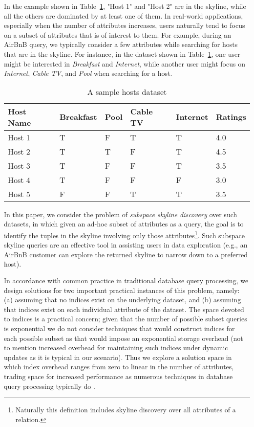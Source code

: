 In the example shown in Table~\ref{tab:hostDataset}, "Host 1" and "Host 2" are in the skyline, while all the others are dominated by at least one of them.
In real-world applications, especially when the number of attributes increases, users naturally tend to focus on a subset of attributes that is of interest to them. For example, during an AirBnB query, 
we typically consider a few attributes while searching for hosts that are in the skyline. For instance, in the dataset shown in Table~\ref{tab:hostDataset}, one user might be interested in \textit{Breakfast} and \textit{Internet}, while another user might focus on \textit{Internet}, \textit{Cable TV}, and \textit{Pool} when searching for a host.


\begin{table}[!t]
\centering
\caption{A sample hosts dataset}\label{tab:hostDataset}
\begin{tabular}{|p{1cm}|p{1.3cm}|p{0.70cm}|p{0.7cm}|p{1cm}|p{1cm}|}
    \hline 
    Host Name & Breakfast & Pool & Cable TV & Internet & Ratings\\
    \hline 
    Host 1 & T & F & T & T & 4.0\\
    Host 2 & T & T & F & T & 4.5\\
    Host 3 & T & F & F & T & 3.5\\
    Host 4 & T & F & F & F & 3.0\\
    Host 5 & F & F & T & T & 3.5\\
    \hline
\end{tabular}
\end{table}

In this paper, we consider the problem of {\em subspace skyline discovery} over such datasets, in which given an ad-hoc subset of attributes as a query, the goal is to identify 
the tuples in the skyline involving only those attributes\footnote{Naturally this definition includes skyline discovery over all attributes of a relation.}. Such subspace skyline queries are an effective tool in assisting users in data exploration (e.g., an AirBnB customer can explore the returned skyline to narrow down to a preferred host). 

In accordance with common practice in traditional database query processing, we design solutions for two important practical instances of this problem, namely: (a) assuming that no indices exist on the underlying dataset, and (b) assuming that indices exist on each individual attribute of the dataset. The space devoted to indices is a practical concern; given that the number of possible subset queries is exponential we do not consider techniques that would construct indices for each possible subset as that would impose an exponential storage overhead (not to mention increased overhead for maintaining such indices under dynamic updates as it is typical in our scenario). Thus we explore a solution space in which index overhead ranges from zero to linear in the number of attributes, trading space for increased performance as numerous techniques in database query processing typically do \cite{gupta1995aggregate, das2006answering, halevy2001answering}.

